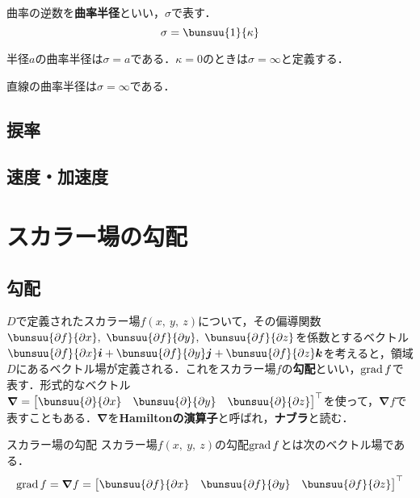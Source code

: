 曲率の逆数を\textbf{曲率半径}といい，$\sigma$で表す．
\begin{equation}
	\sigma = \bunsuu{1}{\kappa}
\end{equation}

\begin{enumerate}[label=\textbf{[\arabic*]}, labelsep=10pt, leftmargin=23pt]
	\item 半径$a$の曲率半径は$\sigma = a$である．$\kappa = 0$のときは$\sigma = \infty$と定義する．
	\item 直線の曲率半径は$\sigma = \infty$である．
\end{enumerate}



\subsection{捩率}



\subsection{速度・加速度}


\section{スカラー場の勾配}
\subsection{勾配}

$D$で定義されたスカラー場$f(x,\ y,\ z)$について，その偏導関数$\bunsuu{\partial f}{\partial x},\ \bunsuu{\partial f}{\partial y},\ \bunsuu{\partial f}{\partial z}$を係数とするベクトル$\bunsuu{\partial f}{\partial x}\bm{i} + \bunsuu{\partial f}{\partial y}\bm{j} + \bunsuu{\partial f}{\partial z}\bm{k}$を考えると，領域$D$にあるベクトル場が定義される．これをスカラー場$f$の\textbf{勾配}といい，$\operatorname{grad} f$で表す．形式的なベクトル$\bm{\nabla} =
\begin{bmatrix}
	\bunsuu{\partial}{\partial x} &
	\bunsuu{\partial}{\partial y} &
	\bunsuu{\partial}{\partial z}
\end{bmatrix}^\top
$を使って，$\bm{\nabla}f$で表すこともある．$\bm{\nabla}$を\textbf{Hamiltonの演算子}と呼ばれ，\textbf{ナブラ}と読む．

\begin{kousiki}{スカラー場の勾配}
	スカラー場$f(x,\ y,\ z)$の勾配$\operatorname{grad} f$とは次のベクトル場である．
	\begin{equation}
		\grad f = \bm{\nabla}f =
		{
		\begin{bmatrix}
			\bunsuu{\partial f}{\partial x} &
			\bunsuu{\partial f}{\partial y} &
			\bunsuu{\partial f}{\partial z}
		\end{bmatrix}
		}^\top
	\end{equation}
\end{kousiki}

